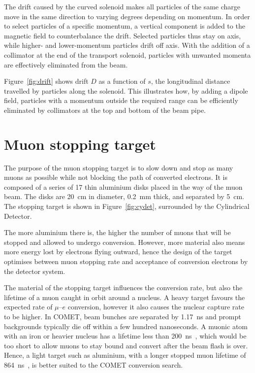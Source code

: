 The drift caused by the curved solenoid makes all particles of the same charge
move in the same direction to varying degrees depending on momentum. In order to
select particles of a specific momentum, a vertical component is added to the
magnetic field to counterbalance the drift. Selected particles thus stay on
axis, while higher- and lower-momentum particles drift off axis. With the addition
of a collimator at the end of the transport solenoid, particles with unwanted
momenta are effectively eliminated from the beam.

Figure~\ref{fig:drift} shows drift $D$ as a function of $s$, the longitudinal
distance travelled by particles along the solenoid. This illustrates how, by
adding a dipole field, particles with a momentum outside the required range can
be efficiently eliminated by collimators at the top and bottom of the beam pipe.

\section{Muon stopping target}\label{sec:stopping_target}
The purpose of the muon stopping target is to slow down and stop as many muons
as possible while not blocking the path of converted electrons. It is composed
of a series of 17 thin aluminium disks placed in the way of the muon beam. The
disks are \SI{20}{\cm} in diameter, \SI{0.2}{\mm} thick, and separated by
\SI{5}{\cm}. The stopping target is shown in Figure~\ref{fig:cydet}, surrounded
by the Cylindrical Detector.

The more aluminium there is, the higher the number of muons that will be stopped
and allowed to undergo conversion. However, more material also means more energy
lost by electrons flying outward, hence the design of the target optimises
between muon stopping rate and acceptance of conversion electrons by the
detector system.


The material of the stopping target influences the conversion rate, but also the
lifetime of a muon caught in orbit around a nucleus. A heavy target favours the
expected rate of $\mu$--$e$ conversion, however it also causes the nuclear
capture rate to be higher. In COMET, beam bunches are separated by
\SI{1.17}{\ns} and prompt backgrounds typically die off within a few hundred
nanoseconds. A muonic atom with an iron or heavier nucleus has a lifetime less
than \SI{200}{\ns}~\cite{ben_thesis}, which would be too short to allow muons to
stay bound and convert after the beam flash is over. Hence, a light target such
as aluminium, with a longer stopped muon lifetime of
\SI{864}{\ns}~\cite{PhysRevC.35.2212}, is better suited to the COMET conversion
search.

